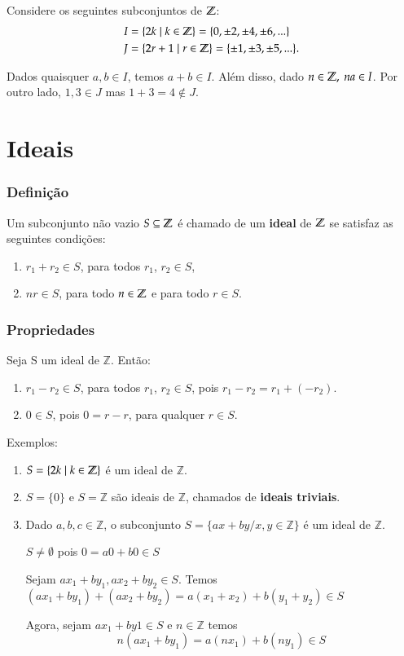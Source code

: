 Considere os seguintes subconjuntos de $\mathbb{Z}$:
\begin{align*}
	I &= \{2k \mid k\in\mathbb{Z}\} = \{0,\pm 2,\pm 4,\pm 6,...\}\\
	J &= \{2r+1\mid r\in\mathbb{Z}\} = \{\pm 1,\pm 3,\pm 5,...\}.
\end{align*}

Dados quaisquer $a,b\in I$, temos $a+b\in I$. Al{\'e}m disso, dado $n\in\mathbb{Z},\ na\in I$. Por outro lado, $1,3\in J$ mas $1+3=4\notin J$.

\section{Ideais}

\subsubsection{Defini{\c c}{\~a}o}
\begin{definicao}
Um subconjunto n{\~a}o vazio $S \subseteq\mathbb{Z}$ {\'e} chamado de um \textbf{ideal} de $\mathbb{Z}$ se satisfaz as seguintes condi{\c c}{\~o}es:
\begin{enumerate}
\item $r_1 + r_2\in S$, para todos $r_1$, $r_2\in S$,
\item $nr \in S$, para todo $n \in\mathbb{Z}$ e para todo $r \in S$.
\end{enumerate}
\end{definicao}

\subsubsection{Propriedades}
Seja S um ideal de $\mathbb{Z}$. Então:
\begin{enumerate}
\item $r_1 - r_2\in S$, para todos $r_1$, $r_2 \in S$, pois $r_1 - r_2 = r_1 + (-r_2)$.
\item $0 \in S$, pois $0 = r - r$, para qualquer $r\in S$.
\end{enumerate}

Exemplos:
\begin{enumerate}
\item $S = \{2k \mid k \in \mathbb{Z}\}$ {\'e} um ideal de $\mathbb{Z}$.
\item $S=\{0\}$ e $S=\mathbb{Z}$ s{\~a}o ideais de $\mathbb{Z}$, chamados de \textbf{ideais triviais}.
\item Dado $a,b,c\in\mathbb{Z}$, o subconjunto $S=\{ax+by/x,y\in\mathbb{Z}\}$ {\'e} um ideal de $\mathbb{Z}$.

$S\neq\emptyset$ pois $0=a0+b0\in S$

Sejam $ax_{1}+by_{1},ax_{2}+by_{2}\in S$. Temos $(ax_{1}+by_{1})+(ax_{2}+by_{2})=a(x_{1}+x_{2})+b(y_{1}+y_{2})\in S$

Agora, sejam $ax_{1}+by{1}\in S$ e $n\in\mathbb{Z}$ temos \[n(ax_{1}+by_{1})=a(nx_{1})+b(ny_{1})\in S\]
\end{enumerate}

